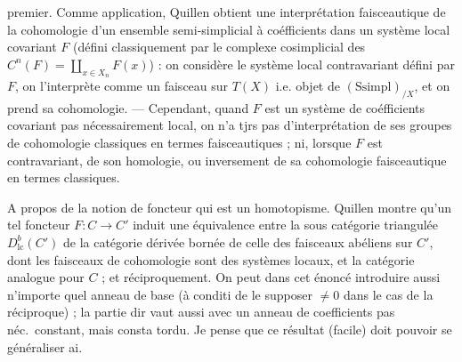 \documentclass[11pt,a4paper]{article}
\begin{document}
premier. Comme application, Quillen obtient une interprétation faisceautique
de la cohomologie d'un ensemble semi-simplicial à coéfficients dans un système
local covariant $F$ (défini classiquement par le complexe cosimplicial des
$C^{n}(F) = \coprod_{x \in X_{n}} F(x)$) : on considère le système local
contravariant défini par $F$, on l'interprète comme un faisceau sur $T(X)$ i.e.
objet de $(\mathrm{Ssimpl})_{/X}$, et on prend sa cohomologie.
--- Cependant, quand $F$ est un système de coéfficients covariant pas
nécessairement local, on n'a tjrs pas d'interprétation de ses groupes de
cohomologie classiques en termes faisceautiques ; ni, lorsque $F$ est
contravariant, de son homologie, ou inversement de sa cohomologie faisceautique
en termes classiques.

A propos de la notion de foncteur qui est un homotopisme. Quillen montre qu'un
tel foncteur $F : C \to C'$ induit une équivalence entre la sous catégorie
triangulée $D^{b}_{\mathrm{lc}}(C')$ de la catégorie dérivée bornée de celle
des faisceaux abéliens sur $C'$, dont les faisceaux de cohomologie sont des
systèmes locaux, et la catégorie analogue pour $C$ ; et réciproquement. On
peut dans cet énoncé introduire aussi n'importe quel anneau de base (à
conditi de le supposer $\neq 0$ dans le cas de la réciproque) ; la
partie dir vaut aussi avec un anneau de coefficients pas néc.\ 
constant, mais consta tordu. Je pense que ce résultat (facile) doit
pouvoir se généraliser ai\supplied{nsi}.
\end{document}
